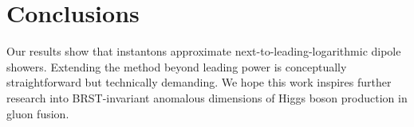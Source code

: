 \section{Conclusions}\label{sec:conclusions}

Our results show that instantons approximate next-to-leading-logarithmic
dipole showers. Extending the method beyond leading power is
conceptually straightforward but technically demanding. We hope this
work inspires further research into BRST-invariant anomalous dimensions
of Higgs boson production in gluon fusion.


